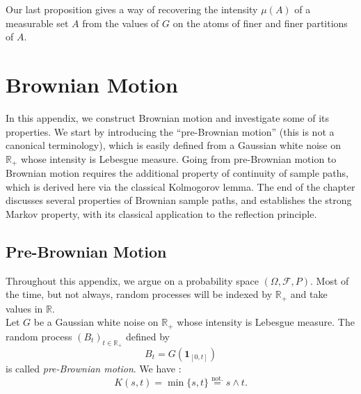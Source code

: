 \documentclass[../Main.tex]{subfiles}
\begin{document}
Our last proposition gives a way of recovering the intensity $\mu(A)$ of a measurable set $A$ from the values of $G$ on the atoms of finer and finer partitions of $A$.




\chapter{Brownian Motion} \label{apen:Brownian_Motion}
 
In this appendix, we construct Brownian motion and investigate some of its properties. We start by introducing the ``pre-Brownian motion'' (this is not a canonical terminology), which is easily defined from a Gaussian white noise on $\mathbb R_+$ whose intensity is Lebesgue measure. Going from pre-Brownian motion to Brownian motion requires the additional property of continuity of sample paths, which is derived here via the classical Kolmogorov lemma. The end of the chapter discusses several properties of Brownian sample paths, and establishes the strong Markov property, with its classical application to the reflection principle.
 
\section{Pre-Brownian Motion}
 
Throughout this appendix, we argue on a probability space $(\Omega,\mathcal F,P)$. Most of the time, but not always, random processes will be indexed by $\mathbb R_+$ and take values in $\mathbb R$. \\ 
Let $G$ be a Gaussian white noise on $\mathbb R_+$ whose intensity is Lebesgue measure. The random process $(B_t)_{t\in\mathbb R_+}$ defined by
\[ B_t = G(\mathbf 1_{[0,t]})\]
is called \emph{pre-Brownian motion}. We have : 
\[ K(s,t) = \min\{s,t\} \overset{\text{not.}}{=} s\wedge t. \]
 
\end{document}
